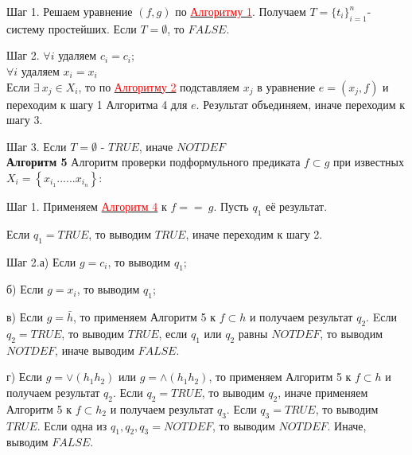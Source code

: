 \documentclass[12pt]{article}
\begin{document}
\begin{comment}     
     Шаг 0. Если $Len(f) \neq Len(g)$, то $FALSE$, иначе переходим к шагу 1.
\end{comment}     
     Шаг 1. Решаем уравнение $(f,g)$ по \hyperlink{a1}{ \textcolor{red} {Алгоритму 1}}.  Получаем  $T = \lbrace  t_{i}  \rbrace_{i=1}^{n} $- систему простейших. Если  $ T= {\emptyset}$, то $FALSE$.
     
     Шаг 2. $\forall i$ удаляем $c_{i} = c_{i}$; 
     \\
      $\forall i$ удаляем $x_{i} = x_{i}$
     \\ 
     Если $\exists \: x_{j} \in X_{i}$, то по \hyperlink{a2}{ \textcolor{red}{Алгоритму 2}} подставляем $x_{j}$  в уравнение $e = (x_{j}, f)$ и переходим к шагу 1 Алгоритма 4 для $e$. Результат объединяем, иначе переходим к шагу 3.
     
     Шаг 3. Если $ T= {\emptyset}$ - $TRUE$, иначе $NOTDEF$
     \\
     
      \hypertarget{a5}{{\bf Алгоритм 5}} Алгоритм проверки подформульного предиката $f \subset g $ при известных $ X_{i} = \left\lbrace x_{i_{1}} ......x_{i_{n}}\right\rbrace $:
\begin{comment}
     Шаг 0. Если $Len(f) > Len(g)$, то $FALSE$, иначе переходим к шагу 1.
\end{comment} 
    
     Шаг 1. Применяем \hyperlink{a3}{ \textcolor{red}{Алгоритм 4}}  к $f == \:g$. Пусть $q_{1}$ её результат.
\begin{comment}
      Если $q_{1} = NOTDEF$, то выводим $q_{1}$
\end{comment}
     
      Если $q_{1} = TRUE$, то выводим $TRUE$, иначе переходим к шагу 2.
     
     Шаг 2.а) Если $ g = c_{i}$, то выводим $q_{1}$;
     
      б) Если $ g = x_{i}$, то выводим $q_{1}$;
      
    в) Если $ g = \bar h$, то применяем  Алгоритм 5 к  $f\subset h$ и получаем результат $q_{2}$. Eсли $q_{2} = TRUE$, то выводим $TRUE$, если $q_{1}$ или $q_{2}$ равны $NOTDEF$, то выводим $NOTDEF$, иначе выводим $FALSE$.
    
    г) Если $ g = \vee (h_{1} h_{2})$ или  $ g = \wedge (h_{1} h_{2})$, то применяем  Алгоритм 5 к  $f\subset h$   и получаем результат $q_{2}$. Если $q_{2} = TRUE$, то выводим $q_{2}$, иначе применяем Алгоритм 5 к $f\subset h_{2}$ и  получаем результат  $q_{3}$. Если $q_{3} = TRUE$, то выводим $TRUE$. Если одна из $q_{1}, q_{2}, q_{3} = NOTDEF$, то выводим $NOTDEF$. Иначе, выводим $FALSE$.
     \\
     
\end{document}
